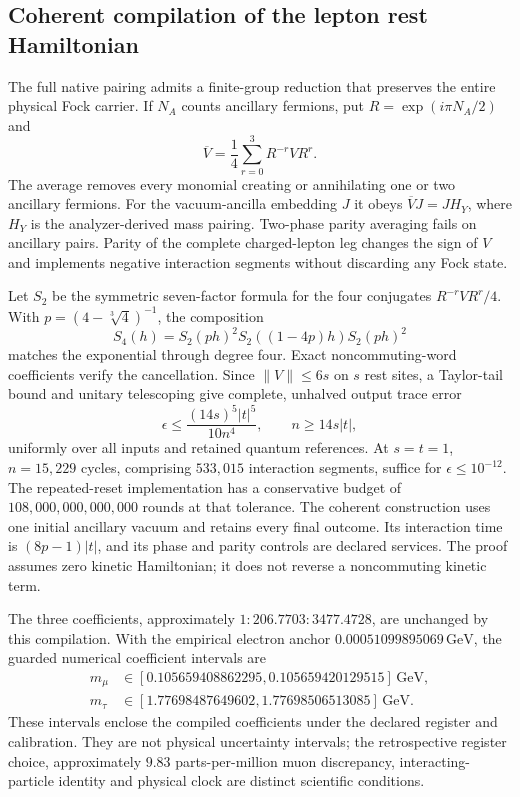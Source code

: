 \subsection{Coherent compilation of the lepton rest Hamiltonian}

The full native pairing admits a finite-group reduction that preserves
the entire physical Fock carrier. If $N_A$ counts ancillary fermions,
put $R=\exp(i\pi N_A/2)$ and
\[
 \overline V=\frac14\sum_{r=0}^3R^{-r}VR^r.
\]
The average removes every monomial creating or annihilating one or two
ancillary fermions. For the vacuum-ancilla embedding $J$ it obeys
$\overline VJ=JH_Y$, where $H_Y$ is the analyzer-derived mass pairing.
Two-phase parity averaging fails on ancillary pairs. Parity of the
complete charged-lepton leg changes the sign of $V$ and implements
negative interaction segments without discarding any Fock state.

Let $S_2$ be the symmetric seven-factor formula for the four conjugates
$R^{-r}VR^r/4$. With $p=(4-\sqrt[3]{4})^{-1}$, the composition
\[
 S_4(h)=S_2(ph)^2S_2((1-4p)h)S_2(ph)^2
\]
matches the exponential through degree four. Exact noncommuting-word
coefficients verify the cancellation. Since $\|V\|\leq6s$ on $s$
rest sites, a Taylor-tail bound and unitary telescoping give complete,
unhalved output trace error
\[
 \epsilon\leq\frac{(14s)^5|t|^5}{10n^4},\qquad n\geq14s|t|,
\]
uniformly over all inputs and retained quantum references. At $s=t=1$,
$n=15{,}229$ cycles, comprising $533{,}015$ interaction segments,
suffice for $\epsilon\leq10^{-12}$. The repeated-reset implementation
has a conservative budget of $108{,}000{,}000{,}000{,}000$ rounds at
that tolerance. The coherent construction uses one initial ancillary
vacuum and retains every final outcome. Its interaction time is
$(8p-1)|t|$, and its phase and parity controls are declared services.
The proof assumes zero kinetic Hamiltonian; it does not reverse a
noncommuting kinetic term.

The three coefficients, approximately $1:206.7703:3477.4728$, are
unchanged by this compilation. With the empirical electron anchor
$0.00051099895069\,\mathrm{GeV}$, the guarded numerical coefficient
intervals are
\[
 \begin{aligned}
 m_\mu&\in[0.105659408862295,0.105659420129515]\,\mathrm{GeV},\\
 m_\tau&\in[1.77698487649602,1.77698506513085]\,\mathrm{GeV}.
 \end{aligned}
\]
These intervals enclose the compiled coefficients under the declared
register and calibration. They are not physical uncertainty intervals;
the retrospective register choice, approximately $9.83$ parts-per-million
muon discrepancy, interacting-particle identity and physical clock
are distinct scientific conditions.

